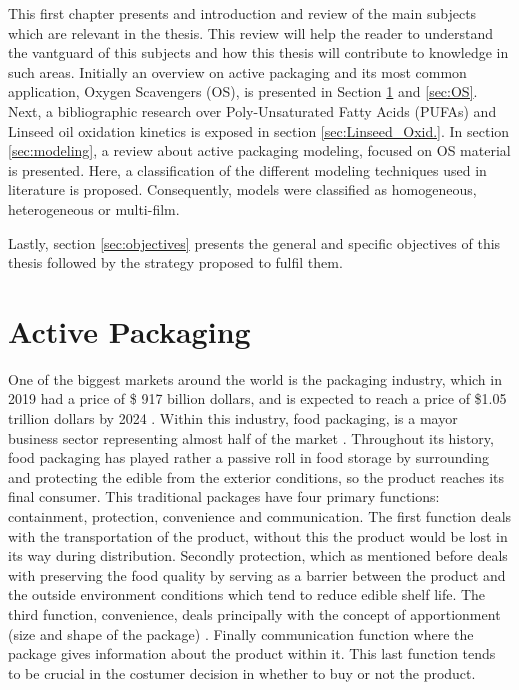 \pagestyle{fancy}
\begin{refsection}
This first chapter presents and introduction and review of the main subjects which are relevant in the thesis. This review will help the reader to understand the vantguard of this subjects and how this thesis will contribute to knowledge in such areas. Initially an overview on active packaging and its most common application, Oxygen Scavengers (OS), is presented in Section \ref{sec:act_pac} and \ref{sec:OS}. Next, a bibliographic research over Poly-Unsaturated Fatty Acids (PUFAs) and Linseed oil oxidation kinetics is exposed in section \ref{sec:Linseed_Oxid.}. In section \ref{sec:modeling}, a review about active packaging modeling, focused on OS material is presented. Here, a classification of the different modeling techniques used in literature is proposed. Consequently, models were classified as homogeneous, heterogeneous or multi-film.

Lastly, section \ref{sec:objectives} presents the general and specific objectives of this thesis followed by the strategy proposed to fulfil them. 

\section{Active Packaging}\label{sec:act_pac}
 One of the biggest markets around the world is the packaging industry, which in 2019 had a price of \$ 917 billion dollars, and is expected to reach a price of \$1.05 trillion dollars by 2024  \cite{Smithers2019The2024}. Within this industry, food packaging, is a mayor business sector representing almost half of the market \cites{TeckKim2014GeneralSystem}{robertson2016food}. Throughout its history, food packaging has played rather a passive roll in food storage by surrounding and protecting the edible from the exterior conditions, so the product reaches its final consumer. This traditional packages have four primary functions: containment, protection, convenience and communication. The first function deals with the transportation of the product, without this the product would be lost in its way during distribution. Secondly protection, which as mentioned before deals with preserving the food quality by  serving as a barrier between the product and the outside environment conditions which tend to reduce edible shelf life. The third function, convenience, deals principally with the concept of apportionment (size and shape of the package) \cite{robertson2016food}. Finally communication function where the package gives information about the product within it. This last function tends to be crucial in the costumer decision in whether to buy or not the product. 
 

\end{refsection}

